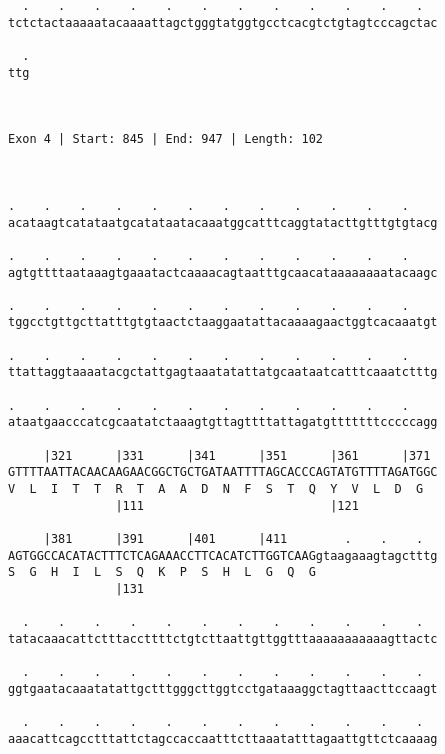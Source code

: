 \documentclass{article}
\begin{document}
\begin{Verbatim}
  .    .    .    .    .    .    .    .    .    .    .    .  
tctctactaaaaatacaaaattagctgggtatggtgcctcacgtctgtagtcccagctac
                                                            
  .
ttg
   
   
 
Exon 4 | Start: 845 | End: 947 | Length: 102



.    .    .    .    .    .    .    .    .    .    .    .    
acataagtcatataatgcatataatacaaatggcatttcaggtatacttgtttgtgtacg
                                                            
.    .    .    .    .    .    .    .    .    .    .    .    
agtgttttaataaagtgaaatactcaaaacagtaatttgcaacataaaaaaaatacaagc
                                                            
.    .    .    .    .    .    .    .    .    .    .    .    
tggcctgttgcttatttgtgtaactctaaggaatattacaaaagaactggtcacaaatgt
                                                            
.    .    .    .    .    .    .    .    .    .    .    .    
ttattaggtaaaatacgctattgagtaaatatattatgcaataatcatttcaaatctttg
                                                            
.    .    .    .    .    .    .    .    .    .    .    .    
ataatgaacccatcgcaatatctaaagtgttagttttattagatgtttttttcccccagg
                                                            
     |321      |331      |341      |351      |361      |371 
GTTTTAATTACAACAAGAACGGCTGCTGATAATTTTAGCACCCAGTATGTTTTAGATGGC
V  L  I  T  T  R  T  A  A  D  N  F  S  T  Q  Y  V  L  D  G  
               |111                          |121           
  
     |381      |391      |401      |411        .    .    .  
AGTGGCCACATACTTTCTCAGAAACCTTCACATCTTGGTCAAGgtaagaaagtagctttg
S  G  H  I  L  S  Q  K  P  S  H  L  G  Q  G                 
               |131                                         
  
  .    .    .    .    .    .    .    .    .    .    .    .  
tatacaaacattctttaccttttctgtcttaattgttggtttaaaaaaaaaaagttactc
                                                            
  .    .    .    .    .    .    .    .    .    .    .    .  
ggtgaatacaaatatattgctttgggcttggtcctgataaaggctagttaacttccaagt
                                                            
  .    .    .    .    .    .    .    .    .    .    .    .  
aaacattcagcctttattctagccaccaatttcttaaatatttagaattgttctcaaaag
                                                            

\end{Verbatim}
\end{document}

